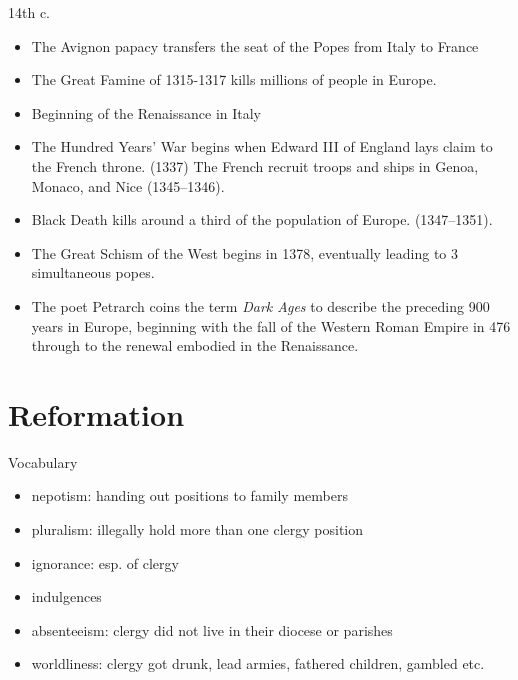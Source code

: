 \begin{frame}[label=sec-1-4]{14th c.}
\begin{itemize}[<+->]
\item The Avignon papacy transfers the seat of the Popes from Italy to France
\item The Great Famine of 1315-1317 kills millions of people in Europe.
\item Beginning of the Renaissance in Italy
\item The Hundred Years' War begins when Edward III of England lays claim to the French throne. (1337) The French recruit troops and ships in Genoa, Monaco, and Nice (1345–1346).
\item Black Death kills around a third of the population of Europe. (1347–1351).
\item The Great Schism of the West begins in 1378, eventually leading to 3 simultaneous popes.
\item The poet Petrarch coins the term \emph{Dark Ages} to describe the preceding 900 years in Europe, beginning with the fall of the Western Roman Empire in 476 through to the renewal embodied in the \alert{Renaissance}.
\end{itemize}
\end{frame}
\section{Reformation}
\label{sec-2}
\begin{frame}[label=sec-2-1]{Vocabulary}
\begin{itemize}[<+->]
\item nepotism: handing out positions to family members
\item pluralism: illegally hold more than one clergy position
\item ignorance: esp. of clergy
\item indulgences
\item absenteeism: clergy did not live in their diocese or parishes
\item worldliness: clergy got drunk, lead armies, fathered children, gambled etc.
\end{itemize}
\end{frame}

